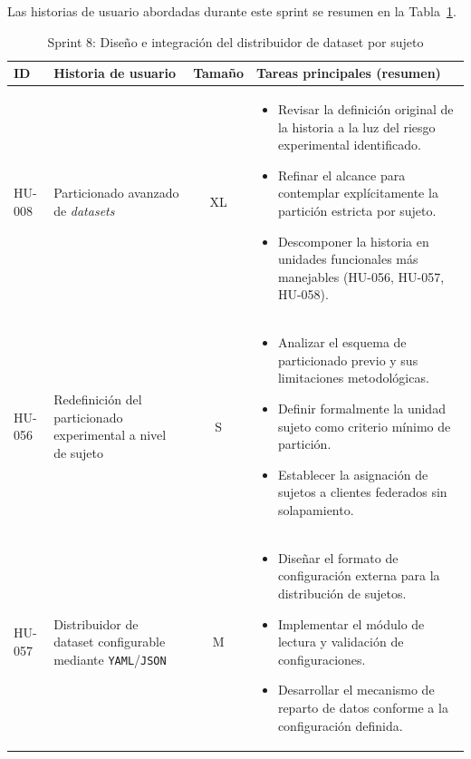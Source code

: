 \documentclass{report}
\begin{document}
Las historias de usuario abordadas durante este sprint se resumen en la Tabla~\ref{tab:sprint8}.
\begin{table}[H]
\centering
\footnotesize
\caption{Sprint 8: Diseño e integración del distribuidor de dataset por sujeto}
\label{tab:sprint8}
\renewcommand{\arraystretch}{1.2}
\setlength{\tabcolsep}{4pt}
\begin{tabular}{|l|p{4.8cm}|c|p{5.6cm}|}
\hline
\textbf{ID} & \textbf{Historia de usuario} & \textbf{Tamaño} & \textbf{Tareas principales (resumen)} \\ \hline

HU-008 &
Particionado avanzado de \textit{datasets} &
XL &
\begin{itemize}\setlength\itemsep{0.15em}
  \item Revisar la definición original de la historia a la luz del riesgo experimental identificado.
  \item Refinar el alcance para contemplar explícitamente la partición estricta por sujeto.
  \item Descomponer la historia en unidades funcionales más manejables (HU-056, HU-057, HU-058).
\end{itemize}
\\ \hline

HU-056 &
Redefinición del particionado experimental a nivel de sujeto &
S &
\begin{itemize}\setlength\itemsep{0.15em}
  \item Analizar el esquema de particionado previo y sus limitaciones metodológicas.
  \item Definir formalmente la unidad sujeto como criterio mínimo de partición.
  \item Establecer la asignación de sujetos a clientes federados sin solapamiento.
\end{itemize}
\\ \hline

HU-057 &
Distribuidor de dataset configurable mediante \texttt{YAML}/\texttt{JSON} &
M &
\begin{itemize}\setlength\itemsep{0.15em}
  \item Diseñar el formato de configuración externa para la distribución de sujetos.
  \item Implementar el módulo de lectura y validación de configuraciones.
  \item Desarrollar el mecanismo de reparto de datos conforme a la configuración definida.
\end{itemize}
\\ \hline


\end{tabular}
\end{table}
\end{document}
